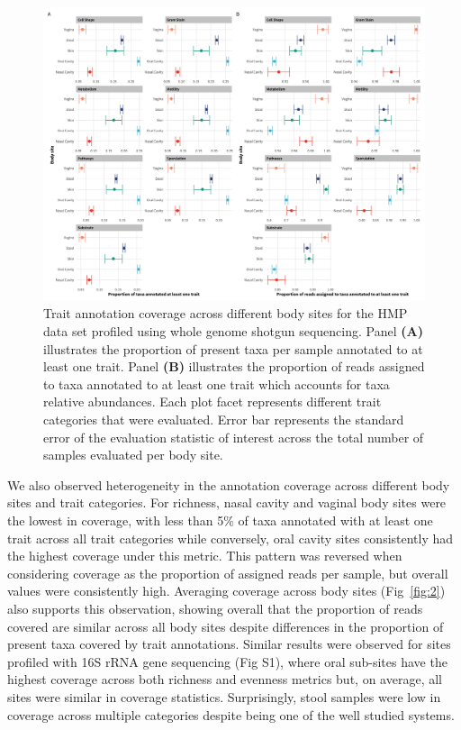 \documentclass[10pt,letterpaper]{article}
\begin{document}
\begin{figure}[!h]
\includegraphics[width=0.99\linewidth]{figures/coverage_wgs.png}
\caption{Trait annotation coverage across different body sites for the HMP data set profiled using whole genome shotgun sequencing. Panel \textbf{(A)} illustrates the proportion of present taxa per sample annotated to at least one trait. Panel \textbf{(B)} illustrates the proportion of reads assigned to taxa annotated to at least one trait which accounts for taxa relative abundances. Each plot facet represents different trait categories that were evaluated. Error bar represents the standard error of the evaluation statistic of interest across the total number of samples evaluated per body site.}
\label{fig:1}
\end{figure}

We also observed heterogeneity in the annotation coverage across different body sites and trait categories. For richness, nasal cavity and vaginal body sites were the lowest in coverage, with less than 5\% of taxa annotated with at least one trait across all trait categories while conversely, oral cavity sites consistently had the highest coverage under this metric. This pattern was reversed when considering coverage as the proportion of assigned reads per sample, but overall values were consistently high. Averaging coverage across body sites (Fig~\ref{fig:2}) also supports this observation, showing overall that the proportion of reads covered are similar across all body sites despite differences in the proportion of present taxa covered by trait annotations. Similar results were observed for sites profiled with 16S rRNA gene sequencing (Fig S1), where oral sub-sites have the highest coverage across both richness and evenness metrics but, on average, all sites were similar in coverage statistics. Surprisingly, stool samples were low in coverage across multiple categories despite being one of the well studied systems. 
\end{document}
